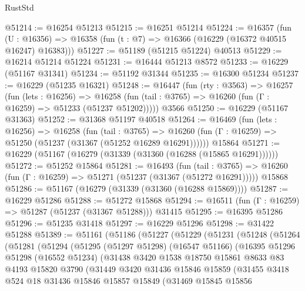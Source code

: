 \begin{lexlean}{RustStd}
\begin{coremodule}
@51214 := @16254 @51213
@51215 := @16251 @51214
@51224 := @16357
    (fun (U : @16356) => @16358 (fun (t : @7) => @16366 (@16229 (@16372 @40515 @16247) @16383)))
@51227 := @51189 (@51215 @51224) @40513
@51229 := @16214 @51214 @51224
@51231 := @16444 @51213 @8572
@51233 := @16229 (@51167 @31341)
@51234 := @51192 @31344
@51235 := @16300 @51234
@51237 := @16229 (@51235 @16321)
@51248 := @16447
    (fun (rty : @3563) =>
    @16257
      (fun (lets : @16256) =>
      @16258 (fun (tail : @3765) => @16260 (fun (Γ : @16259) => @51233 (@51237 @51202)))))
    @3566
@51250 := @16229 (@51167 @31363)
@51252 := @31368 @51197 @40518
@51264 := @16469
    (fun (lets : @16256) =>
    @16258
      (fun (tail : @3765) =>
      @16260 (fun (Γ : @16259) => @51250 (@51237 (@31367 (@51252 @16289 @16291))))))
    @15864
@51271 := @16229 (@51167 (@16279 (@31339 (@31360 (@16288 (@15865 @16291))))))
@51272 := @51252 @15864
@51281 := @16493
    (fun (tail : @3765) => @16260 (fun (Γ : @16259) => @51271 (@51237 (@31367 (@51272 @16291)))))
    @15868
@51286 := @51167 (@16279 (@31339 (@31360 (@16288 @15869))))
@51287 := @16229 @51286
@51288 := @51272 @15868
@51294 := @16511 (fun (Γ : @16259) => @51287 (@51237 (@31367 @51288))) @31415
@51295 := @16395 @51286
@51296 := @51235 @31418
@51297 := @16229 @51296
@51298 := @31422 @51288
@51389 := @51161
    (@51186
      (@51227
        (@51229
          (@51231
            (@51248
              (@51264
                (@51281
                  (@51294
                    (@51295
                      (@51297 @51298)
                      (@16547 @51166)
                      (@16395
                        @51296
                        @51298
                        (@16552 @51234)
                        (@31438
                          @3420
                          @1538
                          @18750
                          @15861
                          @8633
                          @83
                          @4193
                          @15820
                          @3790
                          (@31449
                            @3420
                            @31436
                            @15846
                            @15859
                            (@31455
                              @3418
                              @524
                              @18
                              @31436
                              @15846
                              @15857
                              @15849
                              (@31469
                                @15845
                                @15856

\end{coremodule}
\end{lexlean}
